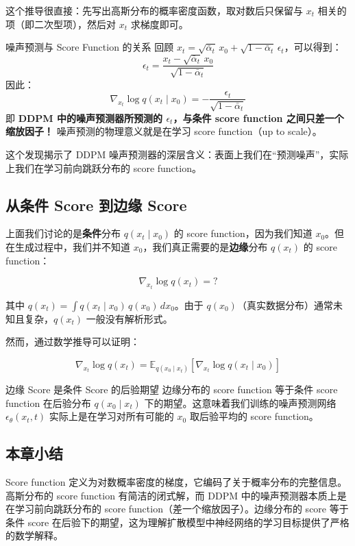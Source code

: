 这个推导很直接：先写出高斯分布的概率密度函数，取对数后只保留与 $x_t$ 相关的项（即二次型项），然后对 $x_t$ 求梯度即可。

\begin{importantbox}{噪声预测与 Score Function 的关系}
回顾 $x_t = \sqrt{\bar{\alpha}_t}\, x_0 + \sqrt{1-\bar{\alpha}_t}\, \epsilon_t$，可以得到：
$$\epsilon_t = \frac{x_t - \sqrt{\bar{\alpha}_t}\, x_0}{\sqrt{1-\bar{\alpha}_t}}$$
因此：
$$\nabla_{x_t} \log q(x_t \mid x_0) = -\frac{\epsilon_t}{\sqrt{1-\bar{\alpha}_t}}$$
即 \textbf{DDPM 中的噪声预测器所预测的 $\epsilon_t$，与条件 score function 之间只差一个缩放因子！} 噪声预测的物理意义就是在学习 score function（up to scale）。
\end{importantbox}

这个发现揭示了 DDPM 噪声预测器的深层含义：表面上我们在``预测噪声''，实际上我们在学习前向跳跃分布的 score function。

\subsection{从条件 Score 到边缘 Score}

上面我们讨论的是\textbf{条件}分布 $q(x_t \mid x_0)$ 的 score function，因为我们知道 $x_0$。但在生成过程中，我们并不知道 $x_0$，我们真正需要的是\textbf{边缘}分布 $q(x_t)$ 的 score function：

$$\nabla_{x_t} \log q(x_t) = ?$$

其中 $q(x_t) = \int q(x_t \mid x_0)\, q(x_0)\, dx_0$。由于 $q(x_0)$（真实数据分布）通常未知且复杂，$q(x_t)$ 一般没有解析形式。

然而，通过数学推导可以证明：

$$\nabla_{x_t} \log q(x_t) = \mathbb{E}_{q(x_0 \mid x_t)}\left[\nabla_{x_t} \log q(x_t \mid x_0)\right]$$

\begin{importantbox}{边缘 Score 是条件 Score 的后验期望}
边缘分布的 score function 等于条件 score function 在后验分布 $q(x_0 \mid x_t)$ 下的期望。这意味着我们训练的噪声预测网络 $\epsilon_\theta(x_t, t)$ 实际上是在学习对所有可能的 $x_0$ 取后验平均的 score function。
\end{importantbox}

\subsection{本章小结}

Score function 定义为对数概率密度的梯度，它编码了关于概率分布的完整信息。高斯分布的 score function 有简洁的闭式解，而 DDPM 中的噪声预测器本质上是在学习前向跳跃分布的 score function（差一个缩放因子）。边缘分布的 score 等于条件 score 在后验下的期望，这为理解扩散模型中神经网络的学习目标提供了严格的数学解释。

